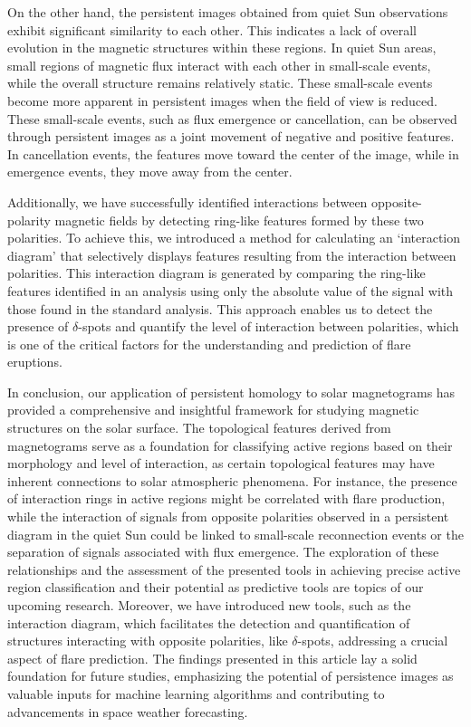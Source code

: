 On the other hand, the persistent images obtained from quiet Sun observations exhibit significant similarity to each other. This indicates a lack of overall evolution in the magnetic structures within these regions. In quiet Sun areas, small regions of magnetic flux interact with each other in small-scale events, while the overall structure remains relatively static. These small-scale events become more apparent in persistent images when the field of view is reduced. These small-scale events, such as flux emergence or cancellation, can be observed through persistent images as a joint movement of negative and positive features. In cancellation events, the features move toward the center of the image, while in emergence events, they move away from the center.

Additionally, we have successfully identified interactions between opposite-polarity magnetic fields by detecting ring-like features formed by these two polarities. To achieve this, we introduced a method for calculating an `interaction diagram' that selectively displays features resulting from the interaction between polarities. This interaction diagram is generated by comparing the ring-like features identified in an analysis using only the absolute value of the signal with those found in the standard analysis. This approach enables us to detect the presence of $\delta$-spots and quantify the level of interaction between polarities, which is one of the critical factors for the understanding and prediction of flare eruptions. 

In conclusion, our application of persistent homology to solar magnetograms has provided a comprehensive and insightful framework for studying magnetic structures on the solar surface. The topological features derived from magnetograms serve as a foundation for classifying active regions based on their morphology and level of interaction, as certain topological features may have inherent connections to solar atmospheric phenomena. For instance, the presence of interaction rings in active regions might be correlated with flare production, while the interaction of signals from opposite polarities observed in a persistent diagram in the quiet Sun could be linked to small-scale reconnection events or the separation of signals associated with flux emergence. The exploration of these relationships and the assessment of the presented tools in achieving precise active region classification and their potential as predictive tools are topics of our upcoming research. Moreover, we have introduced new tools, such as the interaction diagram, which facilitates the detection and quantification of structures interacting with opposite polarities, like $\delta$-spots, addressing a crucial aspect of flare prediction. The findings presented in this article lay a solid foundation for future studies, emphasizing the potential of persistence images as valuable inputs for machine learning algorithms and contributing to advancements in space weather forecasting.

